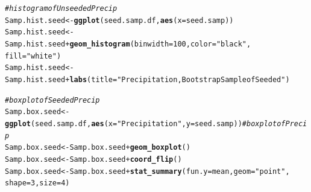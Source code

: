 \documentclass{article}\usepackage[]{graphicx}\usepackage[]{color}
\makeatletter
\newcommand{\hlnum}[1]{\textcolor[rgb]{0.686,0.059,0.569}{#1}}%
\newcommand{\hlstr}[1]{\textcolor[rgb]{0.192,0.494,0.8}{#1}}%
\newcommand{\hlcom}[1]{\textcolor[rgb]{0.678,0.584,0.686}{\textit{#1}}}%
\newcommand{\hlopt}[1]{\textcolor[rgb]{0,0,0}{#1}}%
\newcommand{\hlstd}[1]{\textcolor[rgb]{0.345,0.345,0.345}{#1}}%
\newcommand{\hlkwb}[1]{\textcolor[rgb]{0.69,0.353,0.396}{#1}}%
\newcommand{\hlkwc}[1]{\textcolor[rgb]{0.333,0.667,0.333}{#1}}%
\newcommand{\hlkwd}[1]{\textcolor[rgb]{0.737,0.353,0.396}{\textbf{#1}}}%
\newenvironment{kframe}{%
 \def\at@end@of@kframe{}%
 \ifinner\ifhmode%
  \def\at@end@of@kframe{\end{minipage}}%
  \begin{minipage}{\columnwidth}%
 \fi\fi%
 \def\FrameCommand##1{\hskip\@totalleftmargin \hskip-\fboxsep
 \colorbox{shadecolor}{##1}\hskip-\fboxsep
     \hskip-\linewidth \hskip-\@totalleftmargin \hskip\columnwidth}%
 \MakeFramed {\advance\hsize-\width
   \@totalleftmargin\z@ \linewidth\hsize
   \@setminipage}}%
 {\par\unskip\endMakeFramed%
 \at@end@of@kframe}
\newenvironment{knitrout}{}{} %
\makeatother
\begin{document}
\begin{knitrout}
\color{fgcolor}\begin{kframe}
\begin{alltt}
\hlcom{# histogram of Unseeded Precip}
\hlstd{Samp.hist.seed} \hlkwb{<-} \hlkwd{ggplot}\hlstd{(seed.samp.df,} \hlkwd{aes}\hlstd{(}\hlkwc{x} \hlstd{= seed.samp))}
\hlstd{Samp.hist.seed} \hlkwb{<-} \hlstd{Samp.hist.seed} \hlopt{+} \hlkwd{geom_histogram}\hlstd{(}\hlkwc{binwidth} \hlstd{=} \hlnum{100}\hlstd{,}\hlkwc{color} \hlstd{=} \hlstr{"black"}\hlstd{,}
                                            \hlkwc{fill} \hlstd{=} \hlstr{"white"}\hlstd{)}
\hlstd{Samp.hist.seed} \hlkwb{<-} \hlstd{Samp.hist.seed} \hlopt{+} \hlkwd{labs}\hlstd{(}\hlkwc{title} \hlstd{=} \hlstr{"Precipitation, Bootstrap Sample of Seeded"}\hlstd{)}

\hlcom{# boxplot of Seeded Precip}
\hlstd{Samp.box.seed} \hlkwb{<-} \hlkwd{ggplot}\hlstd{(seed.samp.df,} \hlkwd{aes}\hlstd{(}\hlkwc{x} \hlstd{=} \hlstr{"Precipitation"}\hlstd{,}\hlkwc{y} \hlstd{= seed.samp))} \hlcom{# boxplot of Precip}
\hlstd{Samp.box.seed} \hlkwb{<-} \hlstd{Samp.box.seed} \hlopt{+} \hlkwd{geom_boxplot}\hlstd{()}
\hlstd{Samp.box.seed} \hlkwb{<-} \hlstd{Samp.box.seed} \hlopt{+} \hlkwd{coord_flip}\hlstd{()}
\hlstd{Samp.box.seed} \hlkwb{<-} \hlstd{Samp.box.seed} \hlopt{+} \hlkwd{stat_summary}\hlstd{(}\hlkwc{fun.y} \hlstd{= mean,} \hlkwc{geom} \hlstd{=} \hlstr{"point"}\hlstd{,}
                                        \hlkwc{shape} \hlstd{=} \hlnum{3}\hlstd{,} \hlkwc{size} \hlstd{=} \hlnum{4}\hlstd{)}
\end{alltt}
\end{kframe}
\end{knitrout}
\end{document}
